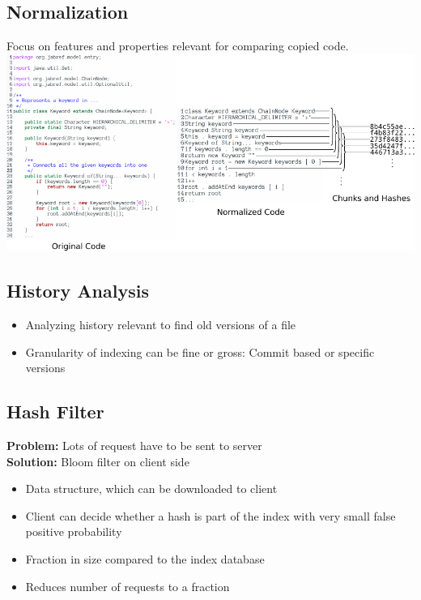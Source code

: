 \subsection{Normalization}
\begin{frame}{\insertsubsection}
	Focus on features and properties relevant for comparing copied code.\\
	\vspace{5mm}
	\includegraphics[width=\linewidth]{../written/figures/normalization.pdf}
\end{frame}

\subsection{History Analysis}
\begin{frame}{\insertsubsection}
	\begin{itemize}
		\item Analyzing history relevant to find old versions of a file
		\item Granularity of indexing can be fine or gross: Commit based or specific versions
	\end{itemize}
\end{frame}


\subsection{Hash Filter}
\begin{frame}{\insertsubsection}
	\textbf{Problem:} Lots of request have to be sent to server\\
	\pause
	\vspace{2mm}
	\textbf{Solution:} Bloom filter on client side
	\vspace{2mm}
	\begin{itemize}
		\item Data structure, which can be downloaded to client
		\item Client can decide whether a hash is part of the index with very small false positive probability
		\item Fraction in size compared to the index database
		\item Reduces number of requests to a fraction
	\end{itemize}
\end{frame}

